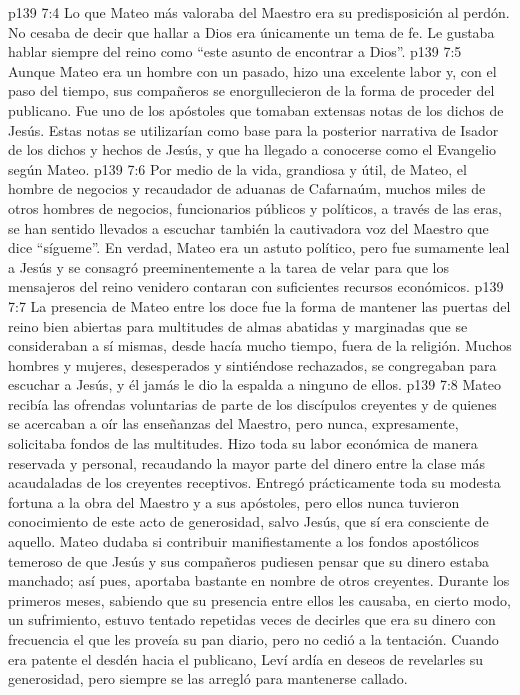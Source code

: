 \vs p139 7:4 Lo que Mateo más valoraba del Maestro era su predisposición al perdón. No cesaba de decir que hallar a Dios era únicamente un tema de fe. Le gustaba hablar siempre del reino como “este asunto de encontrar a Dios”.
\vs p139 7:5 \pc Aunque Mateo era un hombre con un pasado, hizo una excelente labor y, con el paso del tiempo, sus compañeros se enorgullecieron de la forma de proceder del publicano. Fue uno de los apóstoles que tomaban extensas notas de los dichos de Jesús. Estas notas se utilizarían como base para la posterior narrativa de Isador de los dichos y hechos de Jesús, y que ha llegado a conocerse como el Evangelio según Mateo.
\vs p139 7:6 Por medio de la vida, grandiosa y útil, de Mateo, el hombre de negocios y recaudador de aduanas de Cafarnaúm, muchos miles de otros hombres de negocios, funcionarios públicos y políticos, a través de las eras, se han sentido llevados a escuchar también la cautivadora voz del Maestro que dice “sígueme”. En verdad, Mateo era un astuto político, pero fue sumamente leal a Jesús y se consagró preeminentemente a la tarea de velar para que los mensajeros del reino venidero contaran con suficientes recursos económicos.
\vs p139 7:7 La presencia de Mateo entre los doce fue la forma de mantener las puertas del reino bien abiertas para multitudes de almas abatidas y marginadas que se consideraban a sí mismas, desde hacía mucho tiempo, fuera de la religión. Muchos hombres y mujeres, desesperados y sintiéndose rechazados, se congregaban para escuchar a Jesús, y él jamás le dio la espalda a ninguno de ellos.
\vs p139 7:8 \pc Mateo recibía las ofrendas voluntarias de parte de los discípulos creyentes y de quienes se acercaban a oír las enseñanzas del Maestro, pero nunca, expresamente, solicitaba fondos de las multitudes. Hizo toda su labor económica de manera reservada y personal, recaudando la mayor parte del dinero entre la clase más acaudaladas de los creyentes receptivos. Entregó prácticamente toda su modesta fortuna a la obra del Maestro y a sus apóstoles, pero ellos nunca tuvieron conocimiento de este acto de generosidad, salvo Jesús, que sí era consciente de aquello. Mateo dudaba si contribuir manifiestamente a los fondos apostólicos temeroso de que Jesús y sus compañeros pudiesen pensar que su dinero estaba manchado; así pues, aportaba bastante en nombre de otros creyentes. Durante los primeros meses, sabiendo que su presencia entre ellos les causaba, en cierto modo, un sufrimiento, estuvo tentado repetidas veces de decirles que era su dinero con frecuencia el que les proveía su pan diario, pero no cedió a la tentación. Cuando era patente el desdén hacia el publicano, Leví ardía en deseos de revelarles su generosidad, pero siempre se las arregló para mantenerse callado.
